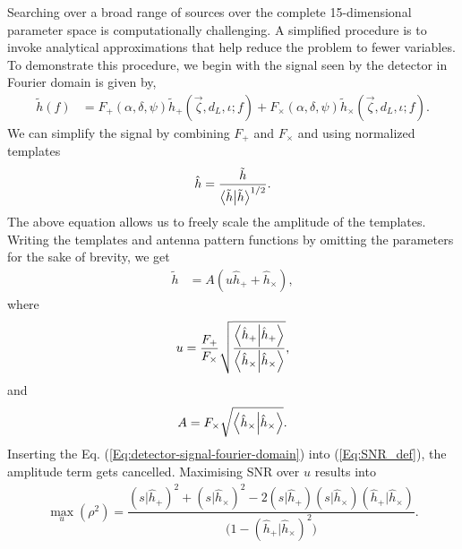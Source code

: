 Searching over a broad range of sources over the complete 15-dimensional parameter space is computationally challenging. A simplified procedure is to invoke analytical approximations that help reduce the problem to fewer variables. To demonstrate this procedure, we begin with the signal seen by the detector in Fourier domain is given by, 
\begin{align}
    \tilde{h}(f) &= F_{+}(\alpha,\delta,\psi)\tilde{h}_{+}(\vec{\zeta}, d_L,\iota;f) + F_{\times}(\alpha,\delta,\psi)\tilde{h}_{\times}(\vec{\zeta}, d_L,\iota;f).
\end{align}
We can simplify the signal by combining $F_+$ and $F_{\times}$ and using normalized templates 
\begin{align}
    \hat{h} = \dfrac{\tilde{h}}{\innerproduct{\tilde{h}}{\tilde{h}}^{1/2}}.
\end{align}
The above equation allows us to freely scale the amplitude of the templates. Writing the templates and antenna pattern functions by omitting the parameters for the sake of brevity, we get
\begin{align}
    \tilde{h} &= A(u\hat{h}_+ + \hat{h}_{\times}), 
    \label{Eq:detector-signal-fourier-domain}
\end{align}
where
\begin{align}
    u = \dfrac{F_{+}}{F_{\times}}\sqrt{\dfrac{\innerproduct{\hat{h}_{+}}{\hat{h}_{+}}}{\innerproduct{\hat{h}_{\times}}{\hat{h}_{\times}}}},
\end{align}
and
\begin{align}
    A = F_{\times}\sqrt{\innerproduct{\hat{h}_{\times}}{\hat{h}_{\times}}}.
\end{align}
Inserting the Eq. (\ref{Eq:detector-signal-fourier-domain}) into (\ref{Eq:SNR_def}), the amplitude term gets cancelled. Maximising SNR over $u$ results into \cite{Harry:2017weg}
\begin{align}
    \max_{u}(\rho^2) = \dfrac{(s|\hat{h}_{+})^2 +
                            (s|\hat{h}_{\times})^2 
                            - 2(s|\hat{h}_{+})(s|\hat{h}_{\times})(\hat{h}_+|\hat{h}_{\times})}{\Big(1-(\hat{h}_+|\hat{h}_{\times})^2\Big)}.
    \label{Eq:Generic-SNR-maximization}
\end{align}

